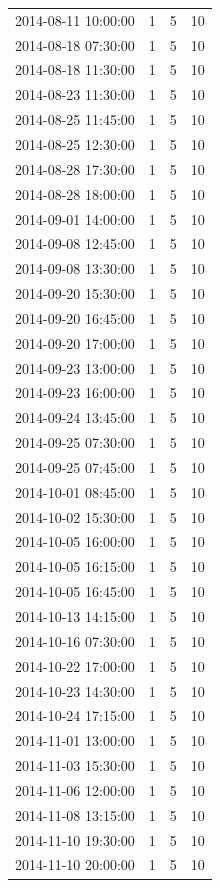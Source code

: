 \begin{tabular}{lrrr}
2014-08-11 10:00:00 & 1 & 5 & 10 \\
2014-08-18 07:30:00 & 1 & 5 & 10 \\
2014-08-18 11:30:00 & 1 & 5 & 10 \\
2014-08-23 11:30:00 & 1 & 5 & 10 \\
2014-08-25 11:45:00 & 1 & 5 & 10 \\
2014-08-25 12:30:00 & 1 & 5 & 10 \\
2014-08-28 17:30:00 & 1 & 5 & 10 \\
2014-08-28 18:00:00 & 1 & 5 & 10 \\
2014-09-01 14:00:00 & 1 & 5 & 10 \\
2014-09-08 12:45:00 & 1 & 5 & 10 \\
2014-09-08 13:30:00 & 1 & 5 & 10 \\
2014-09-20 15:30:00 & 1 & 5 & 10 \\
2014-09-20 16:45:00 & 1 & 5 & 10 \\
2014-09-20 17:00:00 & 1 & 5 & 10 \\
2014-09-23 13:00:00 & 1 & 5 & 10 \\
2014-09-23 16:00:00 & 1 & 5 & 10 \\
2014-09-24 13:45:00 & 1 & 5 & 10 \\
2014-09-25 07:30:00 & 1 & 5 & 10 \\
2014-09-25 07:45:00 & 1 & 5 & 10 \\
2014-10-01 08:45:00 & 1 & 5 & 10 \\
2014-10-02 15:30:00 & 1 & 5 & 10 \\
2014-10-05 16:00:00 & 1 & 5 & 10 \\
2014-10-05 16:15:00 & 1 & 5 & 10 \\
2014-10-05 16:45:00 & 1 & 5 & 10 \\
2014-10-13 14:15:00 & 1 & 5 & 10 \\
2014-10-16 07:30:00 & 1 & 5 & 10 \\
2014-10-22 17:00:00 & 1 & 5 & 10 \\
2014-10-23 14:30:00 & 1 & 5 & 10 \\
2014-10-24 17:15:00 & 1 & 5 & 10 \\
2014-11-01 13:00:00 & 1 & 5 & 10 \\
2014-11-03 15:30:00 & 1 & 5 & 10 \\
2014-11-06 12:00:00 & 1 & 5 & 10 \\
2014-11-08 13:15:00 & 1 & 5 & 10 \\
2014-11-10 19:30:00 & 1 & 5 & 10 \\
2014-11-10 20:00:00 & 1 & 5 & 10 \\

\end{tabular}
